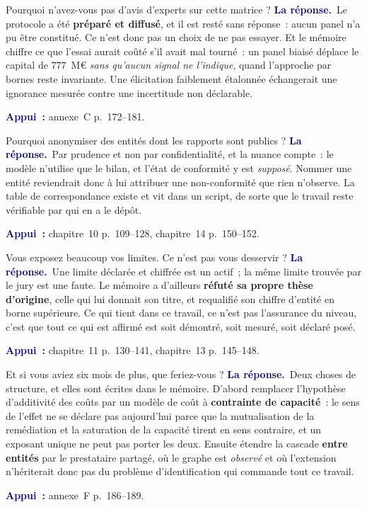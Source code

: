 \documentclass[11pt,a4paper]{article}
\newcommand{\rep}[1]{\smallskip\noindent\textcolor{navy}{\textbf{La réponse.}}\ #1\par}
\newcommand{\appui}[1]{\smallskip\noindent\small\textcolor{navy}{\textbf{Appui~:}} #1\par\normalsize}
\begin{document}
\begin{question}{\og Pourquoi n'avez-vous pas d'avis d'experts sur cette matrice ?\fg{}}
\rep{Le protocole a été \textbf{préparé et diffusé}, et il est resté sans réponse~: aucun panel
n'a pu être constitué. Ce n'est donc pas un choix de ne pas essayer. Et le mémoire chiffre ce que
l'essai aurait coûté s'il avait mal tourné~: un panel biaisé déplace le capital de
$777$~M\euro{} \emph{sans qu'aucun signal ne l'indique}, quand l'approche par bornes reste
invariante. Une élicitation faiblement étalonnée échangerait une ignorance mesurée contre une
incertitude non déclarable.}
\appui{annexe~C p.~172--181.}
\end{question}

\begin{question}{\og Pourquoi anonymiser des entités dont les rapports sont publics ?\fg{}}
\rep{Par prudence et non par confidentialité, et la nuance compte~: le modèle n'utilise que le
bilan, et l'état de conformité y est \emph{supposé}. Nommer une entité reviendrait donc à lui
attribuer une non-conformité que rien n'observe. La table de correspondance existe et vit dans un
script, de sorte que le travail reste vérifiable par qui en a le dépôt.}
\appui{chapitre~10 p.~109--128, chapitre~14 p.~150--152.}
\end{question}

\begin{question}{\og Vous exposez beaucoup vos limites. Ce n'est pas vous desservir ?\fg{}}
\rep{Une limite déclarée et chiffrée est un actif~; la même limite trouvée par le jury est une
faute. Le mémoire a d'ailleurs \textbf{réfuté sa propre thèse d'origine}, celle qui lui donnait
son titre, et requalifié son chiffre d'entité en borne supérieure. Ce qui tient dans ce travail,
ce n'est pas l'assurance du niveau, c'est que tout ce qui est affirmé est soit démontré, soit
mesuré, soit déclaré posé.}
\appui{chapitre~11 p.~130--141, chapitre~13 p.~145--148.}
\end{question}

\begin{question}{\og Et si vous aviez six mois de plus, que feriez-vous ?\fg{}}
\rep{Deux choses de structure, et elles sont écrites dans le mémoire. D'abord remplacer
l'hypothèse d'additivité des coûts par un modèle de coût à \textbf{contrainte de capacité}~: le
sens de l'effet ne se déclare pas aujourd'hui parce que la mutualisation de la remédiation et la
saturation de la capacité tirent en sens contraire, et un exposant unique ne peut pas porter les
deux. Ensuite étendre la cascade \textbf{entre entités} par le prestataire partagé, où le graphe
est \emph{observé} et où l'extension n'hériterait donc pas du problème d'identification qui
commande tout ce travail.}
\appui{annexe~F p.~186--189.}
\end{question}
\end{document}
